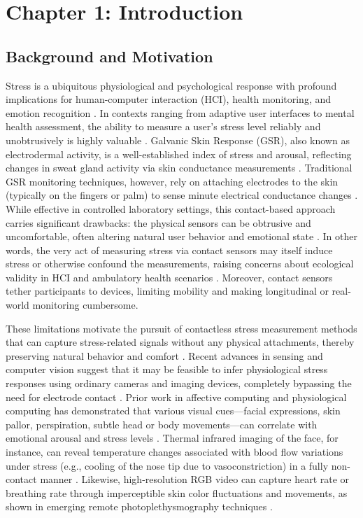 \label{chap:1}
\chapter{Chapter 1: Introduction}

\section{Background and Motivation}

Stress is a ubiquitous physiological and psychological response with profound implications for human-computer interaction (HCI), health monitoring, and emotion recognition
.
In contexts ranging from adaptive user interfaces to mental health assessment, the ability to measure a user's stress level reliably and unobtrusively is highly valuable
.
Galvanic Skin Response (GSR), also known as electrodermal activity, is a well-established index of stress and arousal, reflecting changes in sweat gland activity via skin conductance measurements \cite{Boucsein2012}
.
Traditional GSR monitoring techniques, however, rely on attaching electrodes to the skin (typically on the fingers or palm) to sense minute electrical conductance changes \cite{Fowles1981}
.
While effective in controlled laboratory settings, this contact-based approach carries significant drawbacks: the physical sensors can be obtrusive and uncomfortable, often altering natural user behavior and emotional state \cite{Cacioppo2007}
.
In other words, the very act of measuring stress via contact sensors may itself induce stress or otherwise confound the measurements, raising concerns about ecological validity in HCI and ambulatory health scenarios \cite{Wilhelm2010}
.
Moreover, contact sensors tether participants to devices, limiting mobility and making longitudinal or real-world monitoring cumbersome.

These limitations motivate the pursuit of contactless stress measurement methods that can capture stress-related signals without any physical attachments, thereby preserving natural behavior and comfort
.
Recent advances in sensing and computer vision suggest that it may be feasible to infer physiological stress responses using ordinary cameras and imaging devices, completely bypassing the need for electrode contact \cite{Picard2001}
.
Prior work in affective computing and physiological computing has demonstrated that various visual cues---facial expressions, skin pallor, perspiration, subtle head or body movements---can correlate with emotional arousal and stress levels \cite{Healey2005}
.
Thermal infrared imaging of the face, for instance, can reveal temperature changes associated with blood flow variations under stress (e.g., cooling of the nose tip due to vasoconstriction) in a fully non-contact manner
.
Likewise, high-resolution RGB video can capture heart rate or breathing rate through imperceptible skin color fluctuations and movements, as shown in emerging remote photoplethysmography techniques \cite{Poh2010}.

